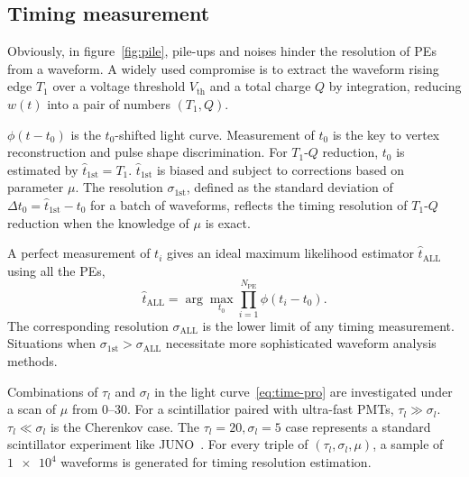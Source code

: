 \subsection{Timing measurement}
Obviously, in figure~\ref{fig:pile}, pile-ups and noises hinder the resolution of PEs from a waveform.  A widely used compromise is to extract the waveform rising edge $T_1$ over a voltage threshold $V_\mathrm{th}$ and a total charge $Q$ by integration, reducing $w(t)$ into a pair of numbers $(T_1, Q)$.

$\phi(t-t_0)$ is the $t_0$-shifted light curve. Measurement of $t_0$ is the key to vertex reconstruction and pulse shape discrimination.  For $T_1$-$Q$ reduction, $t_0$ is estimated by $\hat{t}_\mathrm{1st} = T_1$. $\hat{t}_\mathrm{1st}$ is biased and subject to corrections based on parameter $\mu$. The resolution $\sigma_\mathrm{1st}$, defined as the standard deviation of $\Delta t_0 = \hat{t}_\mathrm{1st} - t_0$ for a 
batch of waveforms, reflects the timing resolution of $T_1$-$Q$ reduction when the knowledge of $\mu$ is exact.

A perfect measurement of $t_i$ gives an ideal maximum likelihood estimator $\hat{t}_\mathrm{ALL}$ using all the PEs,
\begin{equation}
  \label{eq:2}
  \hat{t}_\mathrm{ALL} = \arg\underset{t_0}{\max} \prod_{i=1}^{N_\mathrm{PE}} \phi(t_i-t_0).
\end{equation}
The corresponding resolution $\sigma_\mathrm{ALL}$ is the lower limit of any timing measurement.  Situations when $\sigma_\mathrm{1st} > \sigma_\mathrm{ALL}$ necessitate more sophisticated waveform analysis methods.

Combinations of $\tau_l$ and $\sigma_l$ in the light curve~\eqref{eq:time-pro} are investigated under a scan of $\mu$ from \numrange{0}{30}. For a scintillatior paired with ultra-fast PMTs, $\tau_l \gg \sigma_l$.  $\tau_l \ll \sigma_l$ is the Cherenkov case.  The $\tau_l=20, \sigma_l=5$ case represents a standard scintillator experiment like JUNO~\cite{rebber_particle_2021}.  For every triple of $(\tau_l, \sigma_l, \mu)$, a sample of $\num[retain-unity-mantissa=false]{1e4}$ waveforms is generated for timing resolution estimation.


